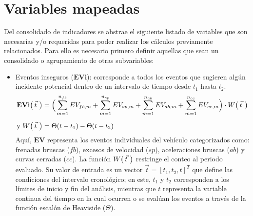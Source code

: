 
\section{Variables mapeadas}
Del consolidado de indicadores se abstrae el siguiente listado de variables que son necesarias y/o requeridas para poder realizar los cálculos previamente relacionados. Para ello es necesario primero definir aquellas que sean un consolidado o agrupamiento de otras subvariables:

\begin{itemize}
    \item Eventos inseguros ($\mathbf{EVi}$): corresponde a todos los eventos que sugieren algún incidente potencial dentro de un intervalo de tiempo desde $t_1$ hasta $t_2$.
    \begin{align*}
        \mathbf{EVi}\big( \hspace{0.07cm} \smash{\vec{t}}\,\vphantom{t} \hspace{0.07cm} \big)&= \Big(\sum_{m=1}^{n_{fb}} EV_{fb,m} + \sum_{m=1}^{n_{sp}} EV_{sp,m} + \sum_{m=1}^{n_{ab}} EV_{ab,m} + \sum_{m=1}^{n_{cc}} EV_{cc,m} \Big) \cdot W\big( \hspace{0.07cm} \smash{\vec{t}}\,\vphantom{t} \hspace{0.07cm} \big) \\[0.2cm]
        \text{y }  W\big( \hspace{0.07cm} \smash{\vec{t}}\,\vphantom{t} \hspace{0.07cm} \big) &= \Theta(t - t_1) - \Theta(t - t_2)
    \end{align*}
    Aquí, $\mathbf{EV}$ representa los eventos individuales del vehículo categorizados como: frenadas bruscas ($fb$), excesos de velocidad ($sp$), aceleraciones bruscas ($ab$) y curvas cerradas ($cc$). La función $W\big( \hspace{0.07cm} \smash{\vec{t}}\,\vphantom{t} \hspace{0.07cm} \big)$ restringe el conteo al periodo evaluado. Su valor de entrada es un vector $\vec{t} = [t_1, t_2, t]^T$ que define las condiciones del intervalo cronológico; en este, $t_1$ y $t_2$ corresponden a los límites de inicio y fin del análisis, mientras que $t$ representa la variable continua del tiempo en la cual ocurren o se evalúan los eventos a través de la función escalón de Heaviside ($\Theta$).
    

\end{itemize}
